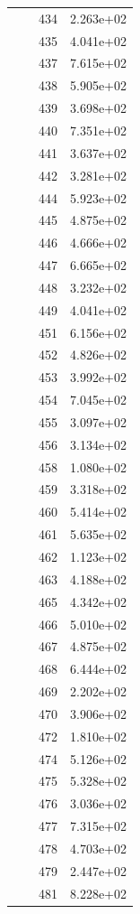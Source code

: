 \documentclass[12pt]{article}
\begin{document}
\begin{longtable}{@{}cccc@{}}
 &  & 434 & 2.263e+02 \\
 &  & 435 & 4.041e+02 \\
 &  & 437 & 7.615e+02 \\
 &  & 438 & 5.905e+02 \\
 &  & 439 & 3.698e+02 \\
 &  & 440 & 7.351e+02 \\
 &  & 441 & 3.637e+02 \\
 &  & 442 & 3.281e+02 \\
 &  & 444 & 5.923e+02 \\
 &  & 445 & 4.875e+02 \\
 &  & 446 & 4.666e+02 \\
 &  & 447 & 6.665e+02 \\
 &  & 448 & 3.232e+02 \\
 &  & 449 & 4.041e+02 \\
 &  & 451 & 6.156e+02 \\
 &  & 452 & 4.826e+02 \\
 &  & 453 & 3.992e+02 \\
 &  & 454 & 7.045e+02 \\
 &  & 455 & 3.097e+02 \\
 &  & 456 & 3.134e+02 \\
 &  & 458 & 1.080e+02 \\
 &  & 459 & 3.318e+02 \\
 &  & 460 & 5.414e+02 \\
 &  & 461 & 5.635e+02 \\
 &  & 462 & 1.123e+02 \\
 &  & 463 & 4.188e+02 \\
 &  & 465 & 4.342e+02 \\
 &  & 466 & 5.010e+02 \\
 &  & 467 & 4.875e+02 \\
 &  & 468 & 6.444e+02 \\
 &  & 469 & 2.202e+02 \\
 &  & 470 & 3.906e+02 \\
 &  & 472 & 1.810e+02 \\
 &  & 474 & 5.126e+02 \\
 &  & 475 & 5.328e+02 \\
 &  & 476 & 3.036e+02 \\
 &  & 477 & 7.315e+02 \\
 &  & 478 & 4.703e+02 \\
 &  & 479 & 2.447e+02 \\
 &  & 481 & 8.228e+02 \\

\end{longtable}
\end{document}
